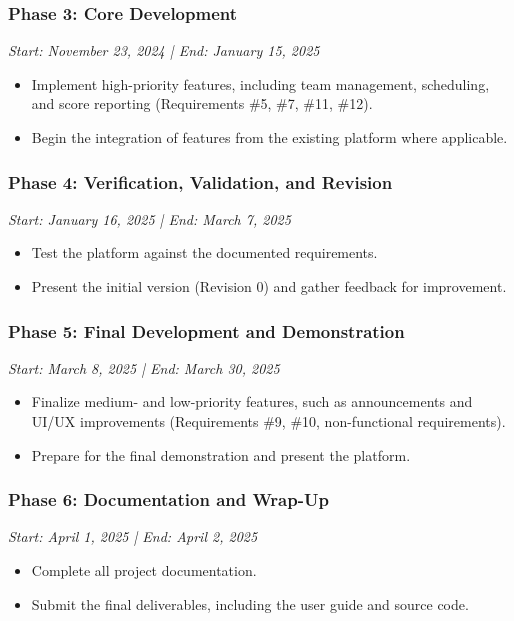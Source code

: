 \documentclass[12pt, titlepage]{article}
\begin{document}
\subsubsection{Phase 3: Core Development}
\textit{Start: November 23, 2024 | End: January 15, 2025}
\begin{itemize}
    \item Implement high-priority features, including team management, scheduling, and score reporting (Requirements \#5, \#7, \#11, \#12).
    \item Begin the integration of features from the existing platform where applicable.
\end{itemize}

\subsubsection{Phase 4: Verification, Validation, and Revision}
\textit{Start: January 16, 2025 | End: March 7, 2025}
\begin{itemize}
    \item Test the platform against the documented requirements.
    \item Present the initial version (Revision 0) and gather feedback for improvement.
\end{itemize}

\subsubsection{Phase 5: Final Development and Demonstration}
\textit{Start: March 8, 2025 | End: March 30, 2025}
\begin{itemize}
    \item Finalize medium- and low-priority features, such as announcements and UI/UX improvements (Requirements \#9, \#10, non-functional requirements).
    \item Prepare for the final demonstration and present the platform.
\end{itemize}

\subsubsection{Phase 6: Documentation and Wrap-Up}
\textit{Start: April 1, 2025 | End: April 2, 2025}
\begin{itemize}
    \item Complete all project documentation.
    \item Submit the final deliverables, including the user guide and source code.
\end{itemize}
\end{document}
